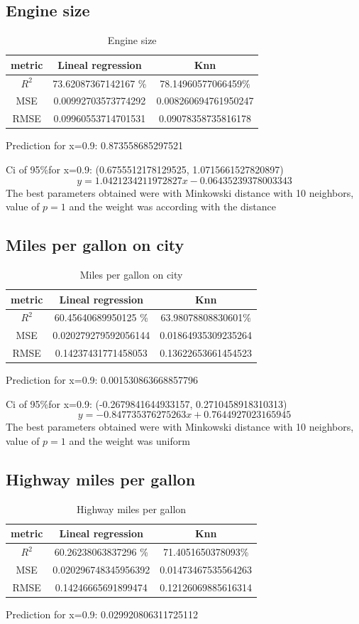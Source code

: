 \documentclass{article}
\begin{document}
\subsection{Engine size}
\begin{table}[H]
\begin{tabular}{|c|c|c|}
  \hline
   metric & Lineal regression & Knn \\ \hline
   $R^2$& 73.62087367142167 \%&78.14960577066459\%\\
   MSE& 0.00992703573774292&0.008260694761950247\\
   RMSE&0.09960553714701531&0.09078358735816178\\
   \hline
  \end{tabular}
  \caption{Engine size}
\end{table}
Prediction for x=0.9: 0.873558685297521

Ci of  95\%for x=0.9: (0.6755512178129525, 1.0715661527820897)
$$y=1.0421234211972827x-0.06435239378003343$$
The best parameters obtained were with Minkowski distance with 10 neighbors,  value of $p=1$ and the weight was according with the distance 
\subsection{Miles per gallon on city }
\begin{table}[H]
\begin{tabular}{|c|c|c|}
  \hline
   metric & Lineal regression & Knn \\ \hline
   $R^2$& 60.45640689950125 \%&63.98078808830601\%\\
   MSE&0.020279279592056144&0.01864935309235264\\
   RMSE&0.14237431771458053&0.13622653661454523\\
   \hline
  \end{tabular}
  \caption{ Miles per gallon on city}
\end{table}
Prediction for x=0.9: 0.001530863668857796

Ci of 95\%for x=0.9: (-0.2679841644933157, 0.2710458918310313)
$$y=-0.847735376275263x+0.7644927023165945$$
The best parameters obtained were with Minkowski distance with 10 neighbors,  value of $p=1$ and the weight was uniform
\subsection{Highway miles per gallon }
\begin{table}[H]
\begin{tabular}{|c|c|c|}
  \hline
   metric & Lineal regression & Knn \\ \hline
   $R^2$& 60.26238063837296 \%&71.4051650378093\%\\
   MSE&0.020296748345956392&0.01473467535564263\\
   RMSE&0.14246665691899474&0.12126069885616314\\
   \hline
  \end{tabular}
  \caption{ Highway miles per gallon}
\end{table}
Prediction for x=0.9: 0.029920806311725112
\end{document}
